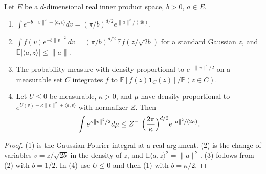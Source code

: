 \begin{lemma}\label{lem:sg-tal:st-quadratic}
  \leanok
{}
Let $E$ be a $d$-dimensional real inner product space, $b>0$, $a\in E$.
\begin{enumerate}
\item $\int e^{-b\|v\|^2+\langle a,v\rangle}dv=(\pi/b)^{d/2}e^{\|a\|^2/(4b)}$.
\item $\int f(v)e^{-b\|v\|^2}dv=(\pi/b)^{d/2}\,\mathbb Ef(z/\sqrt{2b})$ for a standard Gaussian $z$, and
$\mathbb E|\langle a,z\rangle|\le\|a\|$.
\item The probability measure with density proportional to $e^{-\|v\|^2/2}$ on a measurable set $C$
integrates $f$ to $\mathbb E[f(z)\mathbf 1_C(z)]/\mathbb P(z\in C)$.
\item Let $U\le0$ be measurable, $\kappa>0$, and $\mu$ have density proportional to
$e^{U(v)-\kappa\|v\|^2+\langle a,v\rangle}$ with normalizer $Z$. Then
\[
\int e^{\kappa\|v\|^2/2}d\mu\le Z^{-1}\Bigl(\frac{2\pi}\kappa\Bigr)^{d/2}e^{\|a\|^2/(2\kappa)} .
\]
\end{enumerate}
\end{lemma}
\begin{proof}
  \leanok
(1) is the Gaussian Fourier integral at a real argument. (2) is the change of variables $v=z/\sqrt{2b}$ in
the density of $z$, and $\mathbb E\langle a,z\rangle^2=\|a\|^2$. (3) follows from (2) with $b=1/2$. In (4)
use $U\le0$ and then (1) with $b=\kappa/2$.
\end{proof}

